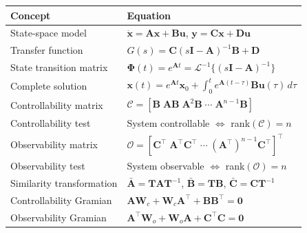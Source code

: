 \begin{center}
\renewcommand{\arraystretch}{1.5}
\begin{tabular}{ll}
\toprule
\textbf{Concept} & \textbf{Equation} \\
\midrule
State-space model & $\dot{\mathbf{x}} = \mathbf{A}\mathbf{x} + \mathbf{B}\mathbf{u}$, \; $\mathbf{y} = \mathbf{C}\mathbf{x} + \mathbf{D}\mathbf{u}$ \\
Transfer function & $G(s) = \mathbf{C}(s\mathbf{I} - \mathbf{A})^{-1}\mathbf{B} + \mathbf{D}$ \\
State transition matrix & $\boldsymbol{\Phi}(t) = e^{\mathbf{A}t} = \mathcal{L}^{-1}\{(s\mathbf{I} - \mathbf{A})^{-1}\}$ \\
Complete solution & $\mathbf{x}(t) = e^{\mathbf{A}t}\mathbf{x}_0 + \int_0^t e^{\mathbf{A}(t-\tau)}\mathbf{B}\mathbf{u}(\tau)\,d\tau$ \\
Controllability matrix & $\mathcal{C} = [\mathbf{B} \; \mathbf{AB} \; \mathbf{A}^2\mathbf{B} \; \cdots \; \mathbf{A}^{n-1}\mathbf{B}]$ \\
Controllability test & System controllable $\Leftrightarrow$ rank$(\mathcal{C}) = n$ \\
Observability matrix & $\mathcal{O} = [\mathbf{C}^\top \; \mathbf{A}^\top\mathbf{C}^\top \; \cdots \; (\mathbf{A}^\top)^{n-1}\mathbf{C}^\top]^\top$ \\
Observability test & System observable $\Leftrightarrow$ rank$(\mathcal{O}) = n$ \\
Similarity transformation & $\bar{\mathbf{A}} = \mathbf{T}\mathbf{A}\mathbf{T}^{-1}$, $\bar{\mathbf{B}} = \mathbf{T}\mathbf{B}$, $\bar{\mathbf{C}} = \mathbf{C}\mathbf{T}^{-1}$ \\
Controllability Gramian & $\mathbf{A}\mathbf{W}_c + \mathbf{W}_c\mathbf{A}^\top + \mathbf{B}\mathbf{B}^\top = \mathbf{0}$ \\
Observability Gramian & $\mathbf{A}^\top\mathbf{W}_o + \mathbf{W}_o\mathbf{A} + \mathbf{C}^\top\mathbf{C} = \mathbf{0}$ \\
\bottomrule
\end{tabular}
\end{center}

